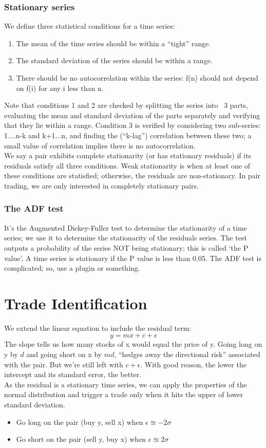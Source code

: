 \documentclass{article}
\begin{document}
\subsubsection{Stationary series}
We define three statistical conditions for a time series:
\begin{enumerate}
    \item The mean of the time series should be within a ``tight'' range.
    \item The standard deviation of the series should be within a range.
    \item There should be no autocorrelation within the series: f(n) should
    not depend on f(i) for any i less than n.
\end{enumerate}
Note that conditions 1 and 2 are checked by splitting the series into ~3 parts,
evaluating the mean and standard deviation of the parts separately and verifying 
that they lie within a range. Condition 3 is verified by considering two sub-series: 1....n-k and k+1...n, and
finding the (``k-lag'') correlation between these two; a small value of 
correlation implies there is no autocorrelation.\\
We say a pair exhibits complete stationarity (or has stationary residuals) if its 
residuals satisfy all three conditions. Weak stationarity is when at least one of 
these conditions are statisfied; otherwise, the residuals are non-stationary. In
pair trading, we are only interested in completely stationary pairs.
\subsubsection{The ADF test}
It's the Augmented Dickey-Fuller test to determine the stationarity of a time 
series; we use it to determine the stationarity of the residuals series. The 
test outputs a probability of the series NOT being stationary; this is called `the
P value'. A time series is stationary if the P value is less than 0.05.
The ADF test is complicated; so, use a plugin or something.
\section{Trade Identification}
We extend the linear equation to include the residual term:
\begin{equation}
    y = mx + c + \epsilon
\end{equation}
The slope tells us how many stocks of x would equal the price of y. Going long on
y by $d$ and going short on x by $md$, ``hedges away the directional risk'' 
associated with the pair. But we're still left with $c+\epsilon$. With good
reason, the lower the intercept and its standard error, the better.\\
As the residual is a stationary time series, we can apply the properties of
the normal distribution and trigger a trade only when it hits the upper of lower
standard deviation.
\begin{itemize}
    \item Go long on the pair (buy y, sell x) when $\epsilon \approxeq -2\sigma$
    \item Go short on the pair (sell y, buy x) when $\epsilon \approxeq 2\sigma$
\end{itemize}
\end{document}
